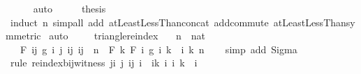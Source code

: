 \begin{isabellebody}
\ \ \ \ \isamarkupfalse%
\ auto\isanewline
\ \ \isamarkupfalse%
\ \isamarkupfalse%
\ {\isacharquery}{\kern0pt}thesis\isanewline
\ \ \ \ \isamarkupfalse%
\ {\isacharparenleft}{\kern0pt}induct\ n{\isacharparenright}{\kern0pt}\ {\isacharparenleft}{\kern0pt}simp{\isacharunderscore}{\kern0pt}all\ add{\isacharcolon}{\kern0pt}\ atLeastLessThan{\isacharunderscore}{\kern0pt}concat\ add{\isachardot}{\kern0pt}commute\ atLeast{}LessThan{\isacharbrackleft}{\kern0pt}symmetric{\isacharbrackright}{\kern0pt}{\isacharparenright}{\kern0pt}\isanewline
{}\isamarkupfalse%
\ auto%
\endisatagproof
{\isafoldproof}%
%
\isadelimproof
\ \ \ \isanewline
%
\endisadelimproof
\isanewline
{}\isamarkupfalse%
\ triangle{\isacharunderscore}{\kern0pt}reindex{\isacharcolon}{\kern0pt}\isanewline
\ \ \ n\ {\isacharcolon}{\kern0pt}{\isacharcolon}{\kern0pt}\ nat\isanewline
\ \ \ {\isachardoublequoteopen}F\ {\isacharparenleft}{\kern0pt}{\isasymlambda}{\isacharparenleft}{\kern0pt}i{\isacharcomma}{\kern0pt}j{\isacharparenright}{\kern0pt}{\isachardot}{\kern0pt}\ g\ i\ j{\isacharparenright}{\kern0pt}\ {\isacharbraceleft}{\kern0pt}{\isacharparenleft}{\kern0pt}i{\isacharcomma}{\kern0pt}j{\isacharparenright}{\kern0pt}{\isachardot}{\kern0pt}\ i{\isacharplus}{\kern0pt}j\ {\isacharless}{\kern0pt}\ n{\isacharbraceright}{\kern0pt}\ {\isacharequal}{\kern0pt}\ F\ {\isacharparenleft}{\kern0pt}{\isasymlambda}k{\isachardot}{\kern0pt}\ F\ {\isacharparenleft}{\kern0pt}{\isasymlambda}i{\isachardot}{\kern0pt}\ g\ i\ {\isacharparenleft}{\kern0pt}k\ {\isacharminus}{\kern0pt}\ i{\isacharparenright}{\kern0pt}{\isacharparenright}{\kern0pt}\ {\isacharbraceleft}{\kern0pt}{\isachardot}{\kern0pt}{\isachardot}{\kern0pt}k{\isacharbraceright}{\kern0pt}{\isacharparenright}{\kern0pt}\ {\isacharbraceleft}{\kern0pt}{\isachardot}{\kern0pt}{\isachardot}{\kern0pt}{\isacharless}{\kern0pt}n{\isacharbraceright}{\kern0pt}{\isachardoublequoteclose}\isanewline
%
\isadelimproof
\ \ %
\endisadelimproof
%
\isatagproof
{}\isamarkupfalse%
\ {\isacharparenleft}{\kern0pt}simp\ add{\isacharcolon}{\kern0pt}\ Sigma{\isacharparenright}{\kern0pt}\isanewline
\ \ \isamarkupfalse%
\ {\isacharparenleft}{\kern0pt}rule\ reindex{\isacharunderscore}{\kern0pt}bij{\isacharunderscore}{\kern0pt}witness{\isacharbrackleft}{\kern0pt}\ j{\isacharequal}{\kern0pt}{\isachardoublequoteopen}{\isasymlambda}{\isacharparenleft}{\kern0pt}i{\isacharcomma}{\kern0pt}\ j{\isacharparenright}{\kern0pt}{\isachardot}{\kern0pt}\ {\isacharparenleft}{\kern0pt}i{\isacharplus}{\kern0pt}j{\isacharcomma}{\kern0pt}\ i{\isacharparenright}{\kern0pt}{\isachardoublequoteclose}\ \ i{\isacharequal}{\kern0pt}{\isachardoublequoteopen}{\isasymlambda}{\isacharparenleft}{\kern0pt}k{\isacharcomma}{\kern0pt}\ i{\isacharparenright}{\kern0pt}{\isachardot}{\kern0pt}\ {\isacharparenleft}{\kern0pt}i{\isacharcomma}{\kern0pt}\ k\ {\isacharminus}{\kern0pt}\ i{\isacharparenright}{\kern0pt}{\isachardoublequoteclose}{\isacharbrackright}{\kern0pt}{\isacharparenright}{\kern0pt}\isanewline

\end{isabellebody}
